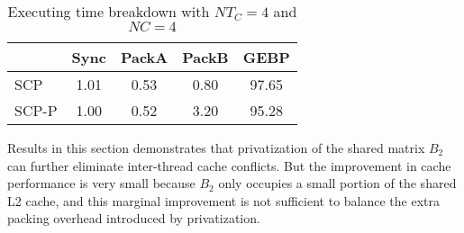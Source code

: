 \begin{table}
  \centering
  \caption{Executing time breakdown with $NT_C=4$ and $NC=4$}
  \label{tab:breakdown}
  \setlength{\tabcolsep}{3.5pt}
  \begin{tabular}{lcccc}
    \toprule
     & Sync & PackA & PackB & GEBP\\
    \midrule
    SCP   & 1.01 & 0.53 & 0.80 & 97.65 \\
    SCP-P & 1.00 & 0.52 & 3.20 & 95.28\\
    \bottomrule
  \end{tabular}
\end{table}

Results in this section demonstrates that
privatization of the shared matrix $B_2$ can further
eliminate inter-thread cache conflicts.
But the improvement in cache performance is very small because
$B_2$ only occupies a small portion of the shared L2 cache,
and this marginal improvement is not sufficient to
balance the extra packing overhead introduced
by privatization.
